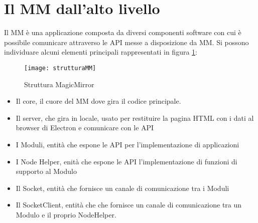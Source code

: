 \section{Il MM dall'alto livello}\label{cap:MMalto}
Il MM \`e una applicazione composta da diversi componenti software con cui \`e possibile
comunicare attraverso le API messe a disposizione da MM.
Si possono individuare alcuni elementi principali rappresentati in figura \ref{fig:struttMM}:
\begin{figure}[H]
    \texttt{[image: strutturaMM]}
    \caption{Struttura MagicMirror}
    \label{fig:struttMM}
\end{figure}
\begin{itemize}
\item Il core, il cuore del MM dove gira il codice principale.
\item Il server, che gira in locale, usato per restituire la pagina HTML con i dati al browser di Electron e comunicare con le API
\item I Moduli, entità che espone le API per l'implementazione di applicazioni
\item I Node Helper, enità che espone le API l'implementazione di funzioni di supporto al Modulo
\item Il Socket, entit\`a che fornisce un canale di comunicazione tra i Moduli
\item Il SocketClient, entit\`a che che fornisce un canale di comunicazione tra un Modulo e il proprio NodeHelper.\\[2\baselineskip]
\end{itemize}

